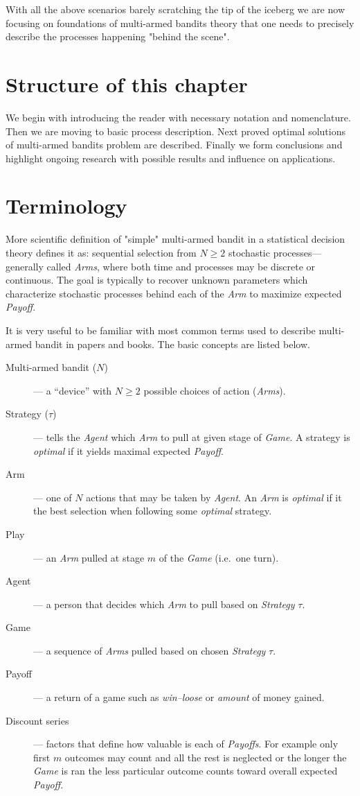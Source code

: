 \documentclass[12pt, a4paper, pdflatex, leqno]{report}
\begin{document}
With all the above scenarios barely scratching the tip of the iceberg we are now focusing on foundations of multi-armed bandits theory that one needs to precisely describe the processes happening "behind the scene".

\section{Structure of this chapter}
We begin with introducing the reader with necessary notation and nomenclature. Then we are moving to basic process description. Next proved optimal solutions of multi-armed bandits problem are described. Finally we form conclusions and highlight ongoing research with possible results and influence on applications.


\section{Terminology}
More scientific definition of "simple" multi-armed bandit in a statistical decision theory defines it as: sequential selection from $N \geq 2$ stochastic processes--- generally called \emph{Arms}, where both time and processes may be discrete or continuous. The goal is typically to recover unknown parameters which characterize stochastic processes behind each of the \emph{Arm} to maximize expected \emph{Payoff}.

It is very useful to be familiar with most common terms used to describe multi-armed bandit in papers and books. The basic concepts are listed below.
\begin{description}
\item[Multi-armed bandit ($N$)]--- a ``device'' with $N \geq 2$ possible choices of action (\emph{Arms}).
\item[Strategy ($\tau$)]--- tells the \emph{Agent} which \emph{Arm} to pull at given stage of \emph{Game}. A strategy is \emph{optimal} if it yields maximal expected \emph{Payoff}.
\item[Arm]--- one of $N$ actions that may be taken by \emph{Agent}. An \emph{Arm} is \emph{optimal} if it the best selection when following some \emph{optimal} strategy.
\item[Play]--- an \emph{Arm} pulled at stage $m$ of the \emph{Game} (i.e.\ one turn).
\item[Agent]--- a person that decides which \emph{Arm} to pull based on \emph{Strategy} $\tau$.
\item[Game]--- a sequence of \emph{Arms} pulled based on chosen \emph{Strategy} $\tau$.
\item[Payoff]--- a return of a game such as \emph{win--loose} or \emph{amount} of money gained.
\item[Discount series]--- factors that define how valuable is each of \emph{Payoffs}. For example only first $m$ outcomes may count and all the rest is neglected or the longer the \emph{Game} is ran the less particular outcome counts toward overall expected \emph{Payoff}.
\end{description}
\end{document}
